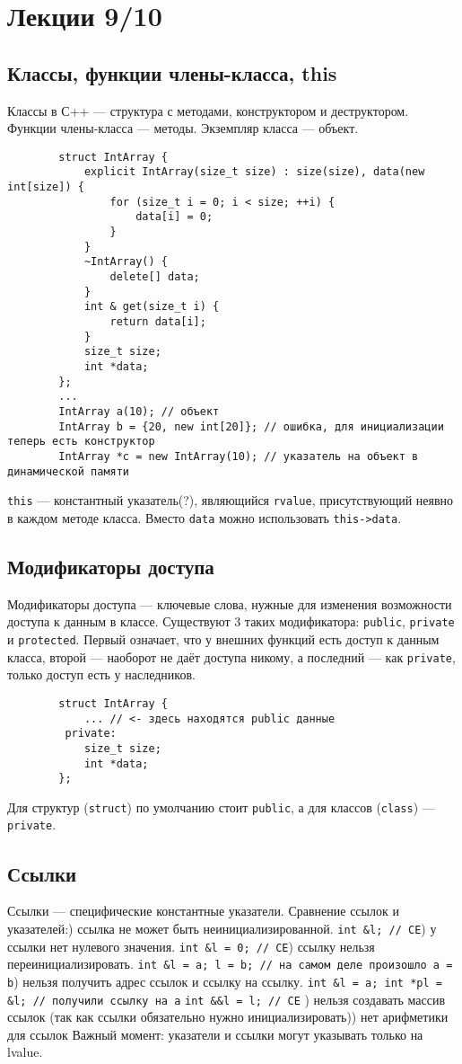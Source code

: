 \documentclass[15pt, a4paper]{article}
\newcommand{\nl}{\newline}
\begin{document}
    \section{Лекции 9/10}
\subsection{Классы, функции члены-класса, this}
    Классы в С++ --- структура с методами, конструктором и деструктором.\nl
    Функции члены-класса --- методы.\nl
    Экземпляр класса --- объект.\nl
    \begin{verbatim}
        struct IntArray {
            explicit IntArray(size_t size) : size(size), data(new int[size]) {
                for (size_t i = 0; i < size; ++i) {
                    data[i] = 0;
                }
            }
            ~IntArray() {
                delete[] data;
            }
            int & get(size_t i) {
                return data[i];
            }
            size_t size;
            int *data;
        };
        ...
        IntArray a(10); // объект
        IntArray b = {20, new int[20]}; // ошибка, для инициализации теперь есть конструктор
        IntArray *c = new IntArray(10); // указатель на объект в динамической памяти
    \end{verbatim}
    \texttt{this} --- константный указатель(?), являющийся \texttt{rvalue}, присутствующий неявно в каждом
    методе класса. Вместо \texttt{data} можно использовать \texttt{this->data}.
  \subsection{Модификаторы доступа}
    Модификаторы доступа --- ключевые слова, нужные для изменения возможности доступа к данным в классе.
    \nl
    Существуют 3 таких модификатора: \texttt{public}, \texttt{private} и \texttt{protected}. Первый означает, что у
    внешних функций есть доступ к данным класса, второй --- наоборот не даёт доступа никому, а последний --- как
    \texttt{private}, только доступ есть у наследников.\nl
    \begin{verbatim}
        struct IntArray {
            ... // <- здесь находятся public данные
         private:
            size_t size;
            int *data;
        };
    \end{verbatim}
    Для структур (\texttt{struct}) по умолчанию стоит \texttt{public}, а для классов (\texttt{class}) --- \texttt{private}.
  \subsection{Ссылки}
  Ссылки --- специфические константные указатели.\nl
  Сравнение ссылок и указателей:\nl
  1) ссылка не может быть неинициализированной. \nl \texttt{int \&l; // CE}\nl
  2) у ссылки нет нулевого значения. \nl \texttt{int \&l = 0; // CE}\nl
  3) ссылку нельзя переинициализировать. \nl \texttt{int \&l = a; l = b; // на самом деле произошло a = b}\nl
  4) нельзя получить адрес ссылок и ссылку на ссылку. \nl \texttt {int \&l = a; int *pl = \&l; // получили ссылку на a} 
  \nl \texttt{int \&\&l = l; // CE} \nl
  5) нельзя создавать массив ссылок (так как ссылки обязательно нужно инициализировать)\nl
  6) нет арифметики для ссылок\nl
  Важный момент: указатели и ссылки могут указывать только на lvalue.
\end{document}
